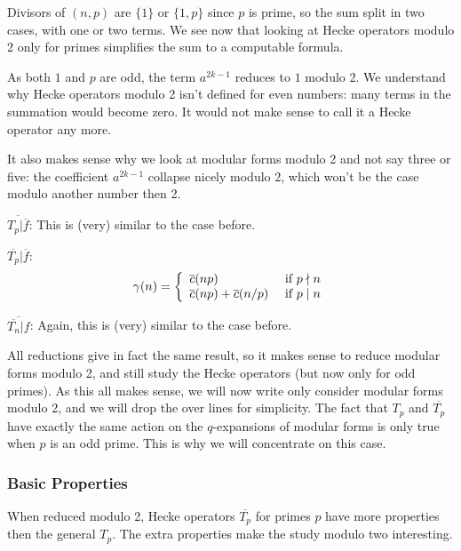 Divisors of $(n,p)$ are $\{1\}$ or $\{1,p\}$ since $p$ is prime, so the sum split in two cases, with one or two terms.
We see now that looking at Hecke operators modulo 2 only for primes simplifies the sum to a computable formula.

As both $1$ and $p$ are odd, the term $a^{2k-1}$ reduces to $1$ modulo 2.
We understand why Hecke operators modulo 2 isn't defined for even numbers: many terms in the summation would become zero.
It would not make sense to call it a Hecke operator any more.

It also makes sense why we look at modular forms modulo 2 and not say three or five: the coefficient $a^{2k-1}$ collapse nicely modulo 2, which won't be the case modulo another number then 2.

$\overline{T_p|\overline{f}}$:
This is (very) similar to the case before.

$\overline{T_p}|\overline{f}$:
$$
\gamma(n)
= \left\lbrace
\begin{array}{l l}
  \overline{c}(np)                   & \text{ if } p \nmid n \\
  \overline{c}(np)+\overline{c}(n/p) & \text{ if } p \mid  n
\end{array}
\right.
$$

$\overline{\overline{T_n}|f}$:
Again, this is (very) similar to the case before.

All reductions give in fact the same result, so it makes sense to reduce modular forms modulo 2, and still study the Hecke operators (but now only for odd primes).
As this all makes sense, we will now write only consider modular forms modulo 2, and we will drop the over lines for simplicity.
The fact that $T_p$ and $\overline{T_p}$ have exactly the same action on the $q$-expansions of modular forms is only true when $p$ is an odd prime.
This is why we will concentrate on this case.

\subsubsection{Basic Properties}
When reduced modulo 2, Hecke operators $\overline{T_p}$ for primes $p$ have more properties then the general $T_p$.
The extra properties make the study modulo two interesting.

